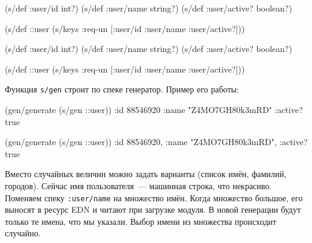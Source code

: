 \ifx\DEVICETYPE\MOBILE

\begin{english}
  \begin{clojure}
(s/def :user/id int?)
(s/def :user/name string?)
(s/def :user/active? boolean?)

(s/def ::user
  (s/keys :req-un [:user/id
                   :user/name
                   :user/active?]))
  \end{clojure}
\end{english}

\else

\begin{english}
  \begin{clojure}
(s/def :user/id int?)
(s/def :user/name string?)
(s/def :user/active? boolean?)

(s/def ::user (s/keys :req-un [:user/id
                               :user/name
                               :user/active?]))
  \end{clojure}
\end{english}

\fi

\noindent
Функция \verb|s/gen| строит по спеке генератор. Пример его работы:

\ifx\DEVICETYPE\MOBILE

\begin{english}
  \begin{clojure}
(gen/generate (s/gen ::user))
{:id 88546920
 :name "Z4MO7GH80k3mRD"
 :active? true}
  \end{clojure}
\end{english}

\else

\begin{english}
  \begin{clojure}
(gen/generate (s/gen ::user))
{:id 88546920, :name "Z4MO7GH80k3mRD", :active? true}
  \end{clojure}
\end{english}

\fi

Вместо случайных величин можно задать варианты (список имён, фамилий,
городов). Сейчас имя пользователя~--- машинная строка, что некрасиво. Поменяем
спеку \texttt{:user\-/name} на множество имён. Когда множество большое, его
выносят в ресурс EDN и читают при загрузке модуля. В новой генерации будут
только те имена, что мы указали. Выбор имени из множества происходит случайно.

\ifx\DEVICETYPE\MOBILE

